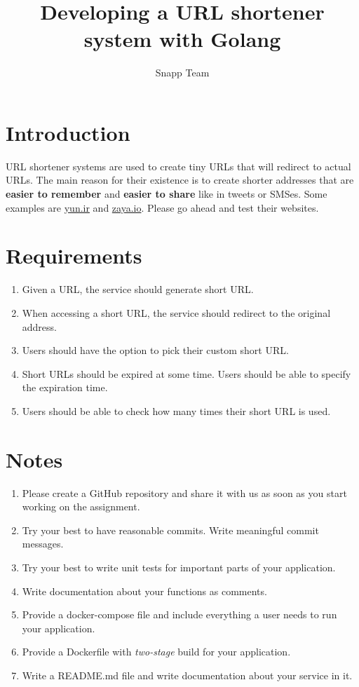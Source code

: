\documentclass{article}
\begin{document}
\title{Developing a URL shortener system with Golang}
\author{Snapp Team}

\maketitle
\tableofcontents

\section{Introduction}

URL shortener systems are used to create tiny URLs that will redirect to actual URLs.
The main reason for their existence is to create shorter addresses that are \textbf{easier to remember} and \textbf{easier to share} like in tweets or SMSes.
Some examples are \href{https://yun.ir/}{yun.ir} and \href{https://zaya.io/}{zaya.io}. Please go ahead and test their websites.

\section{Requirements}

\begin{enumerate}
  \item Given a URL, the service should generate short URL.
  \item When accessing a short URL, the service should redirect to the original address.
  \item Users should have the option to pick their custom short URL.
  \item Short URLs should be expired at some time. Users should be able to specify the expiration time.
  \item Users should be able to check how many times their short URL is used.
\end{enumerate}

\section{Notes}

\begin{enumerate}
  \item Please create a GitHub repository and share it with us as soon as you start working on the assignment.
  \item Try your best to have reasonable commits. Write meaningful commit messages.
  \item Try your best to write unit tests for important parts of your application.
  \item Write documentation about your functions as comments.
  \item Provide a docker-compose file and include everything a user needs to run your application.
  \item Provide a Dockerfile with \textit{two-stage} build for your application.
  \item Write a README.md file and write documentation about your service in it.
\end{enumerate}
\end{document}
